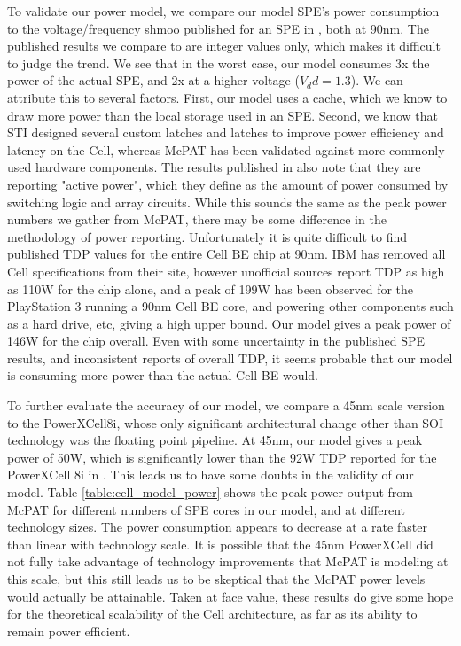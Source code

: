 \documentclass{sig-alternate-05-2015}
\begin{document}
To validate our power model, we compare our model SPE's power consumption to the voltage/frequency shmoo published for an SPE in \cite{flachs2006microarchitecture}, both at 90nm. The published results we compare to are integer values only, which makes it difficult to judge the trend. We see that in the worst case, our model consumes 3x the power of the actual SPE, and 2x at a higher voltage ($V_dd = 1.3$). We can attribute this to several factors. First, our model uses a cache, which we know to draw more power than the local storage used in an SPE. Second, we know that STI designed several custom latches and latches \cite{pham2005design} to improve power efficiency and latency on the Cell, whereas McPAT has been validated against more commonly used hardware components. The results published in \cite{flachs2006microarchitecture} also note that they are reporting "active power", which they define as the amount of power consumed by switching logic and array circuits. While this sounds the same as the peak  power numbers we gather from McPAT, there may be some difference in the methodology of power reporting. Unfortunately it is quite difficult to find published TDP values for the entire Cell BE chip at 90nm. IBM has removed all Cell specifications from their site, however unofficial sources report TDP as high as 110W for the chip alone, and a peak of 199W has been observed for the PlayStation 3 running a 90nm Cell BE core, and powering other components such as a hard drive, etc, giving a high upper bound. Our model gives a peak power of 146W for the chip overall. Even with some uncertainty in the published SPE results, and inconsistent reports of overall TDP, it seems probable that our model is consuming more power than the actual Cell BE would.

To further evaluate the accuracy of our model, we compare a 45nm scale version to the PowerXCell8i, whose only significant architectural change other than SOI technology was the floating point pipeline. At 45nm, our model gives a peak power of 50W, which is significantly lower than the 92W TDP reported for the PowerXCell 8i in \cite{powerxcell}. This leads us to have some doubts in the validity of our model. Table \ref{table:cell_model_power} shows the peak power output from McPAT for different numbers of SPE cores in our model, and at different technology sizes. The power consumption appears to decrease at a rate faster than linear with technology scale. It is possible that the 45nm PowerXCell did not fully take advantage of technology improvements that McPAT is modeling at this scale, but this still leads us to be skeptical that the McPAT power levels would actually be attainable. Taken at face value, these results do give some hope for the theoretical scalability of the Cell architecture, as far as its ability to remain power efficient.
\end{document}
